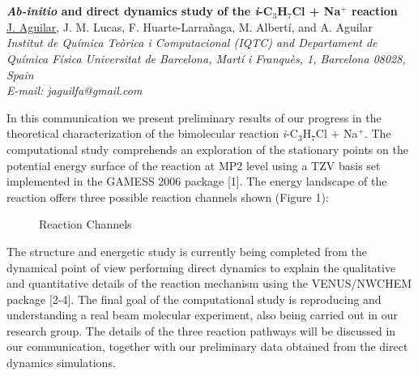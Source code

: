 \section*{}
\begin{center}
{\bf \Large {\it \bf  Ab-initio} and direct dynamics study of the \textit{i}-C$_{3}$H$_{7}$Cl + Na$^{+}$ reaction }
\\
\vspace{0.5cm}
\underline{J. Aguilar}, J. M. Lucas, F. Huarte-Larrañaga, M. Albertí, and A. Aguilar
\\
\vspace{0.5cm}
{\it
Institut de Química Teòrica i Computacional (IQTC) and
Departament de Química Física
Universitat de Barcelona,
Martí i Franquès, 1, Barcelona 08028, Spain}
\\
\vspace{0.5cm}
{\it E-mail: jaguilfa@gmail.com}
\\
\vspace{0.5cm}
\end{center}
In this communication we present preliminary results of our progress in the
theoretical characterization of the bimolecular reaction \textit{i}-C$_{3}$H$_{7}$Cl + Na$^{+}$. The
computational study comprehends an exploration of the stationary points on the
potential energy surface of the reaction at MP2 level using a TZV basis set
implemented in the GAMESS 2006 package [1]. The energy landscape of the reaction
offers three possible reaction channels shown (Figure 1):
\begin{figure}[h]
 \centerline{}
 \caption[]{Reaction Channels}\label{figure 1}
\end{figure}
The structure and energetic study is currently being completed from the dynamical
point of view performing direct dynamics to explain the qualitative and quantitative
details of the reaction mechanism using the VENUS/NWCHEM package [2-4]. The
final goal of the computational study is reproducing and understanding a real beam
molecular experiment, also being carried out in our research group. The details of the
three reaction pathways will be discussed in our communication, together with our
preliminary data obtained from the direct dynamics simulations.
